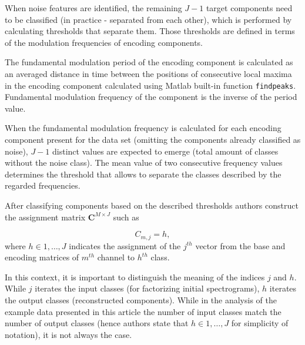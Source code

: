 \documentclass[3p,12pt]{elsarticle}
\begin{document}


When noise features are identified, the remaining $J-1$ target components need to be classified (in practice - separated from each other), which is performed by calculating thresholds that separate them. Those thresholds are defined in terms of the modulation frequencies of encoding components. 

The fundamental modulation period of the encoding component is calculated as an averaged distance in time between the positions of consecutive local maxima in the encoding component calculated using Matlab built-in function \texttt{findpeaks}. Fundamental modulation frequency of the component is the inverse of the period value.

When the fundamental modulation frequency is calculated for each encoding component present for the data set (omitting the components already classified as noise), $J-1$ distinct values are expected to emerge (total amount of classes without the noise class). The mean value of two consecutive frequency values determines the threshold that allows to separate the classes described by the regarded frequencies.


After classifying components based on the described thresholds authors construct the assignment matrix $\mathbf{C}^{M\times J}$ such as

\begin{equation}
\label{def_C_matrix}
   C_{m,j}=h, 
\end{equation}
where $h\in 1,\dots,J$ indicates the assignment of the $j^{th}$ vector from the base and encoding matrices of $m^{th}$ channel to $h^{th}$ class. 

In this context, it is important to distinguish the meaning of the indices $j$ and $h$. While $j$ iterates the input classes (for factorizing initial spectrograms), $h$ iterates the output classes (reconstructed components). While in the analysis of the example data presented in this article the number of input classes match the number of output classes (hence authors state that $h\in 1,\dots,J$ for simplicity of notation), it is not always the case. 
\end{document}
